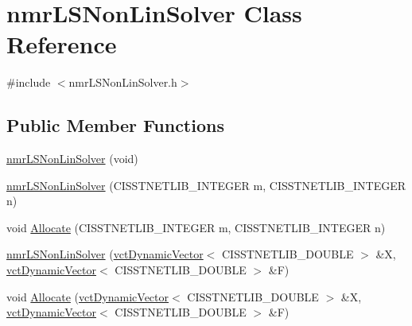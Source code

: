\hypertarget{classnmr_l_s_non_lin_solver}{}\section{nmr\+L\+S\+Non\+Lin\+Solver Class Reference}
\label{classnmr_l_s_non_lin_solver}


{\ttfamily \#include $<$nmr\+L\+S\+Non\+Lin\+Solver.\+h$>$}

\subsection*{Public Member Functions}
\begin{DoxyCompactItemize}
\item 
\hyperlink{classnmr_l_s_non_lin_solver_abe9e4c062db3cfc45144fcba00e5f980}{nmr\+L\+S\+Non\+Lin\+Solver} (void)
\item 
\hyperlink{classnmr_l_s_non_lin_solver_ad71720d43f800176a34e958796b8d229}{nmr\+L\+S\+Non\+Lin\+Solver} (C\+I\+S\+S\+T\+N\+E\+T\+L\+I\+B\+\_\+\+I\+N\+T\+E\+G\+E\+R m, C\+I\+S\+S\+T\+N\+E\+T\+L\+I\+B\+\_\+\+I\+N\+T\+E\+G\+E\+R n)
\item 
void \hyperlink{classnmr_l_s_non_lin_solver_af1449ecddc4c7c0301cac792d7eb28e2}{Allocate} (C\+I\+S\+S\+T\+N\+E\+T\+L\+I\+B\+\_\+\+I\+N\+T\+E\+G\+E\+R m, C\+I\+S\+S\+T\+N\+E\+T\+L\+I\+B\+\_\+\+I\+N\+T\+E\+G\+E\+R n)
\end{DoxyCompactItemize}
{\bf }\par
\begin{DoxyCompactItemize}
\item 
\hyperlink{classnmr_l_s_non_lin_solver_a249ee56a277a7d33fd9de29b599cb236}{nmr\+L\+S\+Non\+Lin\+Solver} (\hyperlink{classvct_dynamic_vector}{vct\+Dynamic\+Vector}$<$ C\+I\+S\+S\+T\+N\+E\+T\+L\+I\+B\+\_\+\+D\+O\+U\+B\+L\+E $>$ \&X, \hyperlink{classvct_dynamic_vector}{vct\+Dynamic\+Vector}$<$ C\+I\+S\+S\+T\+N\+E\+T\+L\+I\+B\+\_\+\+D\+O\+U\+B\+L\+E $>$ \&F)
\end{DoxyCompactItemize}

{\bf }\par
\begin{DoxyCompactItemize}
\item 
void \hyperlink{classnmr_l_s_non_lin_solver_a11fa2fa4e34aec01e92ab01eb35689fd}{Allocate} (\hyperlink{classvct_dynamic_vector}{vct\+Dynamic\+Vector}$<$ C\+I\+S\+S\+T\+N\+E\+T\+L\+I\+B\+\_\+\+D\+O\+U\+B\+L\+E $>$ \&X, \hyperlink{classvct_dynamic_vector}{vct\+Dynamic\+Vector}$<$ C\+I\+S\+S\+T\+N\+E\+T\+L\+I\+B\+\_\+\+D\+O\+U\+B\+L\+E $>$ \&F)
\end{DoxyCompactItemize}

